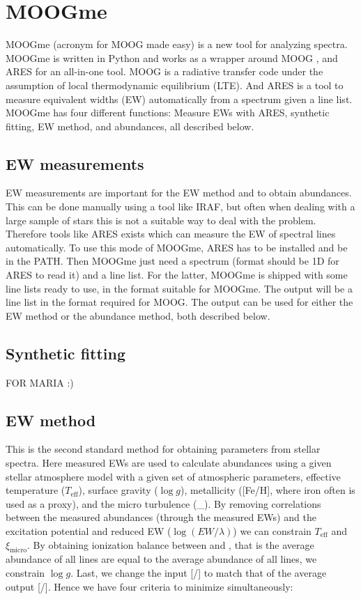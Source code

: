 \documentclass{aa}
\begin{document}
\section{MOOGme}
\label{sec:MOOGme}

MOOGme (acronym for MOOG made easy) is a new tool for analyzing spectra.
MOOGme is written in Python and works as a wrapper around MOOG
\citep{Sneden1973}, and ARES \citep{Sousa2015a} for an all-in-one tool.
MOOG is a radiative transfer code under the assumption of local
thermodynamic equilibrium (LTE). And ARES is a tool to measure equivalent
widths (EW) automatically from a spectrum given a line list. MOOGme has
four different functions: Measure EWs with ARES, synthetic fitting, EW method,
and abundances, all described below.

\subsection{EW measurements}
\label{sub:EW_measurements}
EW measurements are important for the EW method and to obtain abundances. This
can be done manually using a tool like IRAF, but often when dealing with a large
sample of stars this is not a suitable way to deal with the problem. Therefore
tools like ARES exists which can measure the EW of spectral lines automatically.
To use this mode of MOOGme, ARES has to be installed and be in the PATH. Then
MOOGme just need a spectrum (format should be 1D for ARES to read it) and a line
list. For the latter, MOOGme is shipped with some line lists ready to use, in
the format suitable for MOOGme. The output will be a line list in the format
required for MOOG. The output can be used for either the EW method or the
abundance method, both described below.


\subsection{Synthetic fitting}
\label{sub:Synthetic_fitting}

FOR MARIA :)



\subsection{EW method}
\label{sub:EW_method}
This is the second standard method for obtaining parameters from stellar
spectra. Here measured EWs are used to calculate abundances using a given
stellar atmosphere model with a given set of atmospheric parameters,
effective temperature ($T_\mathrm{eff}$), surface gravity ($\log g$),
metallicity ([Fe/H], where iron often is used as a proxy), and the micro
turbulence (\xi_). By removing correlations between the measured
abundances (through the measured EWs) and the excitation potential and reduced
EW ($\log(EW/\lambda)$) we can constrain $T_\mathrm{eff}$ and $\xi_\mathrm{micro}$. By
obtaining ionization balance between  and , that is
the average abundance of all  lines are equal to the average
abundance of all  lines, we constrain $\log g$. Last, we change
the input [/] to match that of the average output
[/]. Hence we have four criteria to minimize simultaneously:
\end{document}
